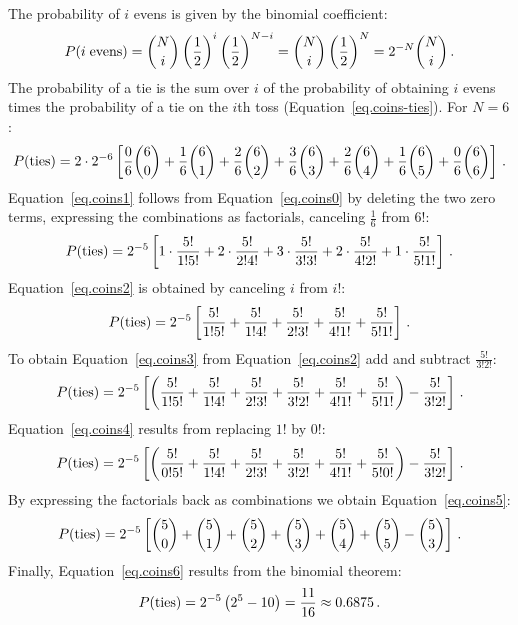 The probability of $i$ evens is given by the binomial coefficient:
\begin{equation}\label{eq.coins00}
P(i\;\textrm{evens})=\displaystyle{N \choose i} \left(\displaystyle\frac{1}{2}\right)^i \left(\displaystyle\frac{1}{2}\right)^{N-i}=\displaystyle{N \choose i} \left(\displaystyle\frac{1}{2}\right)^N =  2^{-N}\displaystyle{N \choose i}\,.
\end{equation}
The probability of a tie is the sum over $i$ of the probability of obtaining $i$ evens times the probability of a tie on the $i$th toss (Equation~\ref{eq.coins-ties}). For $N=6$:
\begin{equation}\label{eq.coins0}
P(\textrm{ties})=2\cdot 2^{-6}\left[
\frac{0}{6}\displaystyle{6 \choose 0} + \frac{1}{6}\displaystyle{6 \choose 1} +
\frac{2}{6}\displaystyle{6 \choose 2} + \frac{3}{6}\displaystyle{6 \choose 3} +
\frac{2}{6}\displaystyle{6 \choose 4} + \frac{1}{6}\displaystyle{6 \choose 5} +
\frac{0}{6}\displaystyle{6 \choose 6}
\right]\,.
\end{equation}
Equation~\ref{eq.coins1} follows from Equation~\ref{eq.coins0} by deleting the two zero terms, expressing the combinations as factorials, canceling $\frac{1}{6}$ from $6!$:
\begin{equation}\label{eq.coins1}
P(\textrm{ties})=2^{-5}\left[
1\cdot\displaystyle\frac{5!}{1!5!} + 2\cdot\displaystyle\frac{5!}{2!4!} +
3\cdot\displaystyle\frac{5!}{3!3!} + 2\cdot\displaystyle\frac{5!}{4!2!} +
1\cdot\displaystyle\frac{5!}{5!1!}
\right]\,.
\end{equation}
Equation~\ref{eq.coins2} is obtained by canceling $i$ from $i!$:
\begin{equation}\label{eq.coins2}
P(\textrm{ties})=2^{-5}\left[
\displaystyle\frac{5!}{1!5!} + \displaystyle\frac{5!}{1!4!} +
\displaystyle\frac{5!}{2!3!} + \displaystyle\frac{5!}{4!1!} +
\displaystyle\frac{5!}{5!1!}
\right]\,.
\end{equation}
To obtain Equation~\ref{eq.coins3} from Equation~\ref{eq.coins2} add and subtract  $\frac{5!}{3!2!}$:
\begin{equation}\label{eq.coins3}
P(\textrm{ties})=2^{-5}\left[
\left(\displaystyle\frac{5!}{1!5!} + \displaystyle\frac{5!}{1!4!} +
\displaystyle\frac{5!}{2!3!} + \displaystyle\frac{5!}{3!2!} +\displaystyle\frac{5!}{4!1!} +
\displaystyle\frac{5!}{5!1!}\right) - \displaystyle\frac{5!}{3!2!}
\right]\,.
\end{equation}
Equation~\ref{eq.coins4} results from  replacing $1!$ by $0!$:
\begin{equation}\label{eq.coins4}
P(\textrm{ties})=2^{-5}\left[
\left(\displaystyle\frac{5!}{0!5!} + \displaystyle\frac{5!}{1!4!} +
\displaystyle\frac{5!}{2!3!} + \displaystyle\frac{5!}{3!2!} +\displaystyle\frac{5!}{4!1!} +
\displaystyle\frac{5!}{5!0!}\right) - \displaystyle\frac{5!}{3!2!}
\right]\,.
\end{equation}
By expressing the factorials back as combinations we obtain  Equation~\ref{eq.coins5}:
\begin{equation}\label{eq.coins5}
P(\textrm{ties})=2^{-5}\left[
\displaystyle{5 \choose 0} + \displaystyle{5 \choose 1} +
\displaystyle{5 \choose 2} + \displaystyle{5 \choose 3} +
\displaystyle{5 \choose 4} + \displaystyle{5 \choose 5} - \displaystyle{5 \choose 3}
\right]\,.
\end{equation}
Finally, Equation~\ref{eq.coins6} results from the binomial theorem:
\begin{equation}\label{eq.coins6}
P(\textrm{ties})=2^{-5}\left(2^5 - 10\right)=\displaystyle\frac{11}{16}\approx 0.6875\,.
\end{equation}

